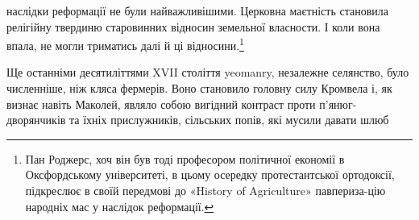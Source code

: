 наслідки реформації не були найважливішими. Церковна
маєтність становила релігійну твердиню старовинних відносин
земельної власности. І коли вона впала, не могли триматись
далі й ці відносини.\footnote{
Пан Роджерс, хоч він був тоді професором політичної економії в
Оксфордському університеті, в цьому осередку протестантської ортодоксії,
підкреслює в своїй передмові до «History of Agriculture» павпериза-цію
народніх мас у наслідок реформації.
}

Ще останніми десятиліттями XVII століття yeomanry, незалежне
селянство, було численніше, ніж кляса фермерів. Воно
становило головну силу Кромвела і, як визнає навіть Маколей,
являло собою вигідний контраст проти п’янюг-дворянчиків та
їхніх прислужників, сільських попів, які мусили давати шлюб